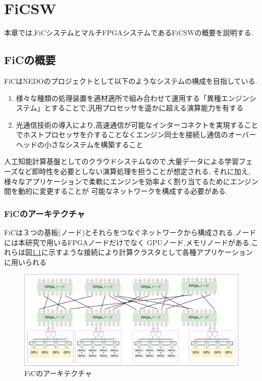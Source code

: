 \chapter{FiCSW}
{
  \label{chap:ficsw}
  本章では,FiCシステムとマルチFPGAシステムであるFiCSWの概要を説明する.
  
  \section{FiCの概要}
  \label{sec:about_fic}
  FiCはNEDOのプロジェクトとして以下のようなシステムの構成を目指している.
  
  \begin{enumerate}
    \item 様々な種類の処理装置を適材適所で組み合わせて運用する「異種エンジンシステム」とすることで,汎用プロセッサを遥かに超える演算能力を有する
    \item 光通信技術の導入により,高速通信が可能なインターコネクトを実現することでホストプロセッサを介することなくエンジン同士を接続し通信のオーバーヘッドの小さなシステムを構築すること
  \end{enumerate}
  
  人工知能計算基盤としてのクラウドシステムなので,大量データによる学習フェーズなど即時性を必要としない演算処理を担うことが想定される,
  それに加え,様々なアプリケーションで柔軟にエンジンを効率よく割り当てるためにエンジン間を動的に変更することが
  可能なネットワークを構成する必要がある.
  
  \subsection{FiCのアーキテクチャ}
  \label{sec:arch_fic}
  FiCは３つの基板(ノード)とそれらをつなぐネットワークから構成される.ノードには本研究で用いるFPGAノードだけでなく
  GPUノード,メモリノードがある.これらは図\ref{fig:arch_fic}に示すような接続により計算クラスタとして各種アプリケーションに用いられる
  
  \begin{figure}[h]
    \centering
    \includegraphics[scale=0.5]{./chap3/fig/arch_fic.pdf}
    \caption{FiCのアーキテクチャ}
    \label{fig:arch_fic}
  \end{figure}
  
}
